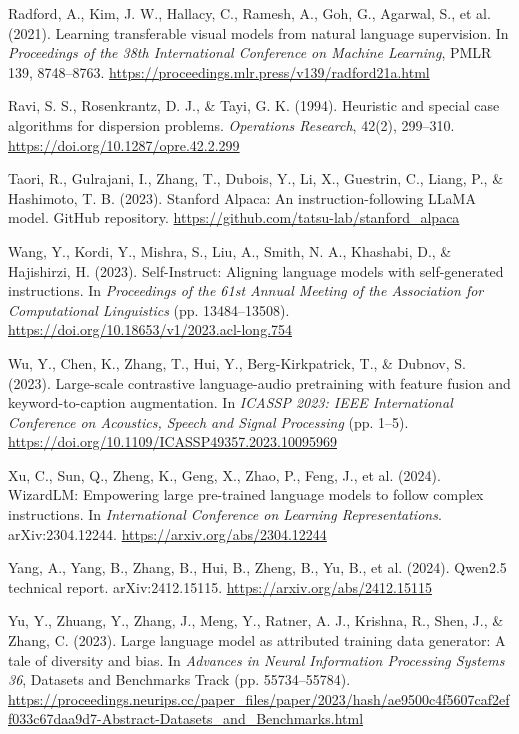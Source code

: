 \documentclass[
  10pt,
]{article}
\theoremstyle{plain}
\theoremstyle{definition}
\begin{document}
Radford, A., Kim, J. W., Hallacy, C., Ramesh, A., Goh, G., Agarwal, S.,
et al. (2021). Learning transferable visual models from natural language
supervision. In \emph{Proceedings of the 38th International Conference
on Machine Learning}, PMLR 139, 8748--8763.
\url{https://proceedings.mlr.press/v139/radford21a.html}

Ravi, S. S., Rosenkrantz, D. J., \& Tayi, G. K. (1994). Heuristic and
special case algorithms for dispersion problems. \emph{Operations
Research}, 42(2), 299--310. \url{https://doi.org/10.1287/opre.42.2.299}

Taori, R., Gulrajani, I., Zhang, T., Dubois, Y., Li, X., Guestrin, C.,
Liang, P., \& Hashimoto, T. B. (2023). Stanford Alpaca: An
instruction-following LLaMA model. GitHub repository.
\url{https://github.com/tatsu-lab/stanford_alpaca}

Wang, Y., Kordi, Y., Mishra, S., Liu, A., Smith, N. A., Khashabi, D., \&
Hajishirzi, H. (2023). Self-Instruct: Aligning language models with
self-generated instructions. In \emph{Proceedings of the 61st Annual
Meeting of the Association for Computational Linguistics} (pp.
13484--13508). \url{https://doi.org/10.18653/v1/2023.acl-long.754}

Wu, Y., Chen, K., Zhang, T., Hui, Y., Berg-Kirkpatrick, T., \& Dubnov,
S. (2023). Large-scale contrastive language-audio pretraining with
feature fusion and keyword-to-caption augmentation. In \emph{ICASSP
2023: IEEE International Conference on Acoustics, Speech and Signal
Processing} (pp. 1--5).
\url{https://doi.org/10.1109/ICASSP49357.2023.10095969}

Xu, C., Sun, Q., Zheng, K., Geng, X., Zhao, P., Feng, J., et al. (2024).
WizardLM: Empowering large pre-trained language models to follow complex
instructions. In \emph{International Conference on Learning
Representations}. arXiv:2304.12244.
\url{https://arxiv.org/abs/2304.12244}

Yang, A., Yang, B., Zhang, B., Hui, B., Zheng, B., Yu, B., et al.
(2024). Qwen2.5 technical report. arXiv:2412.15115.
\url{https://arxiv.org/abs/2412.15115}

Yu, Y., Zhuang, Y., Zhang, J., Meng, Y., Ratner, A. J., Krishna, R.,
Shen, J., \& Zhang, C. (2023). Large language model as attributed
training data generator: A tale of diversity and bias. In \emph{Advances
in Neural Information Processing Systems 36}, Datasets and Benchmarks
Track (pp. 55734--55784).
\url{https://proceedings.neurips.cc/paper_files/paper/2023/hash/ae9500c4f5607caf2eff033c67daa9d7-Abstract-Datasets_and_Benchmarks.html}
\end{document}

